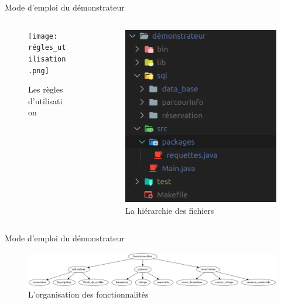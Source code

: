 \documentclass{beamer}
\begin{document}
\begin{frame}{Mode d'emploi du démonstrateur}
  \begin{columns}
    \begin{column}{0.7\textwidth}
        \begin{figure}[H]
      \texttt{[image: régles\_utilisation.png]}
\caption{Les règles d'utilisation}
\end{figure}
      \end{column}
    \begin{column}{0.3\textwidth}
        \begin{figure}[H]
      \includegraphics[width=\textwidth]{h_p.png}
\caption{La hiérarchie des fichiers}
\end{figure}
      \end{column}
    \end{columns}
  \end{frame}

  \begin{frame}{Mode d'emploi du démonstrateur}
        \begin{figure}[H]
      \includegraphics[width=\textwidth]{g.png}
\caption{L'organisation des fonctionnalités}
\end{figure}
  \end{frame}
\end{document}

